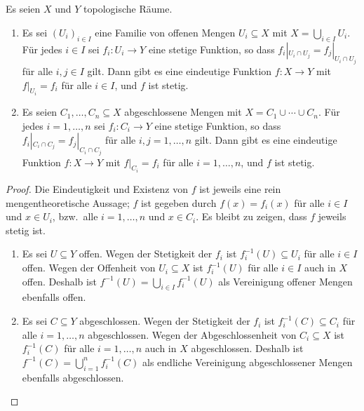 \section{}


\begin{lemma}
  \label{lemma: glueing lemma for continuous maps}
  Es seien $X$ und $Y$ topologische Räume.
  \begin{enumerate}[label = \alph*)]
    \item
      Es sei $(U_i)_{i \in I}$ eine Familie von offenen Mengen $U_i \subseteq X$ mit $X = \bigcup_{i \in I} U_i$.
      Für jedes $i \in I$ sei $f_i \colon U_i \to Y$ eine stetige Funktion, so dass $f_i|_{U_i \cap U_j} = f_j|_{U_i \cap U_j}$ für alle $i,j \in I$ gilt.
      Dann gibt es eine eindeutige Funktion $f \colon X \to Y$ mit $f|_{U_i} = f_i$ für alle $i \in I$, und $f$ ist stetig.
    \item
      Es seien $C_1, \dotsc, C_n \subseteq X$ abgeschlossene Mengen mit $X = C_1 \cup \dotsb \cup C_n$.
      Für jedes $i = 1, \dotsc, n$ sei $f_i \colon C_i \to Y$ eine stetige Funktion, so dass $f_i|_{C_i \cap C_j} = f_j|_{C_i \cap C_j}$ für alle $i,j = 1, \dotsc, n$ gilt.
      Dann gibt es eine eindeutige Funktion $f \colon X \to Y$ mit $f|_{C_i} = f_i$ für alle $i = 1, \dotsc, n$, und $f$ ist stetig.
  \end{enumerate}
\end{lemma}

\begin{proof}
  Die Eindeutigkeit und Existenz von $f$ ist jeweils eine rein mengentheoretische Aussage;
  $f$ ist gegeben durch $f(x) = f_i(x)$ für alle $i \in I$ und $x \in U_i$, bzw.\ alle $i = 1, \dotsc, n$ und $x \in C_i$.
  Es bleibt zu zeigen, dass $f$ jeweils stetig ist.
  \begin{enumerate}
    \item
      Es sei $U \subseteq Y$ offen.
      Wegen der Stetigkeit der $f_i$ ist $f_i^{-1}(U) \subseteq U_i$ für alle $i \in I$ offen.
      Wegen der Offenheit von $U_i \subseteq X$ ist $f_i^{-1}(U)$ für alle $i \in I$ auch in $X$ offen.
      Deshalb ist $f^{-1}(U) = \bigcup_{i \in I} f_i^{-1}(U)$ als Vereinigung offener Mengen ebenfalls offen.
    
    \item
      Es sei $C \subseteq Y$ abgeschlossen.
      Wegen der Stetigkeit der $f_i$ ist $f_i^{-1}(C) \subseteq C_i$ für alle $i = 1, \dotsc, n$ abgeschlossen.
      Wegen der Abgeschlossenheit von $C_i \subseteq X$ ist $f_i^{-1}(C)$ für alle $i = 1, \dotsc, n$ auch in $X$ abgeschlossen.
      Deshalb ist $f^{-1}(C) = \bigcup_{i=1}^n f_i^{-1}(C)$ als endliche Vereinigung abgeschlossener Mengen ebenfalls abgeschlossen.
    \qedhere
  \end{enumerate}
\end{proof}


